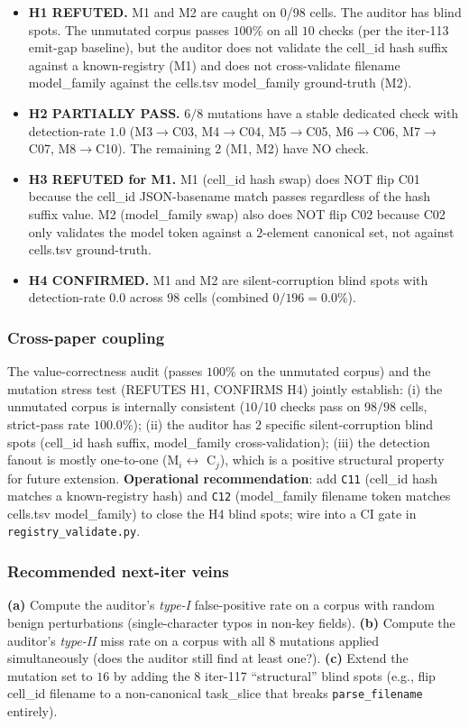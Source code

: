 \begin{itemize}
  \item \textbf{H1 REFUTED.} M1 and M2 are caught on 0/98 cells. The
        auditor has blind spots. The unmutated corpus passes $100\%$
        on all $10$ checks (per the iter-113 emit-gap baseline),
        but the auditor does not validate the cell\_id hash suffix
        against a known-registry (M1) and does not cross-validate
        filename model\_family against the cells.tsv model\_family
        ground-truth (M2).
  \item \textbf{H2 PARTIALLY PASS.} $6/8$ mutations have a stable
        dedicated check with detection-rate $1.0$ (M3$\to$C03,
        M4$\to$C04, M5$\to$C05, M6$\to$C06, M7$\to$C07,
        M8$\to$C10). The remaining $2$ (M1, M2) have NO check.
  \item \textbf{H3 REFUTED for M1.} M1 (cell\_id hash swap) does NOT
        flip C01 because the cell\_id JSON-basename match passes
        regardless of the hash suffix value. M2 (model\_family swap)
        also does NOT flip C02 because C02 only validates the model
        token against a $2$-element canonical set, not against
        cells.tsv ground-truth.
  \item \textbf{H4 CONFIRMED.} M1 and M2 are silent-corruption blind
        spots with detection-rate $0.0$ across $98$ cells (combined
        $0/196 = 0.0\%$).
\end{itemize}

\subsubsection{Cross-paper coupling}

The value-correctness audit (passes $100\%$ on the unmutated corpus)
and the mutation stress test (REFUTES H1, CONFIRMS H4) jointly
establish: (i) the unmutated corpus is internally consistent
($10/10$ checks pass on $98/98$ cells, strict-pass rate $100.0\%$);
(ii) the auditor has $2$ specific silent-corruption blind spots
(cell\_id hash suffix, model\_family cross-validation); (iii) the
detection fanout is mostly one-to-one (M$_i \leftrightarrow$ C$_j$),
which is a positive structural property for future extension.
\textbf{Operational recommendation}: add \texttt{C11} (cell\_id hash
matches a known-registry hash) and \texttt{C12} (model\_family
filename token matches cells.tsv model\_family) to close the H4
blind spots; wire into a CI gate in \texttt{registry\_validate.py}.

\subsubsection{Recommended next-iter veins}

\textbf{(a)} Compute the auditor's \emph{type-I} false-positive rate
on a corpus with random benign perturbations (single-character typos
in non-key fields). \textbf{(b)} Compute the auditor's \emph{type-II}
miss rate on a corpus with all $8$ mutations applied simultaneously
(does the auditor still find at least one?). \textbf{(c)} Extend the
mutation set to $16$ by adding the $8$ iter-117 ``structural'' blind
spots (e.g., flip cell\_id filename to a non-canonical task\_slice that
breaks \texttt{parse\_filename} entirely).